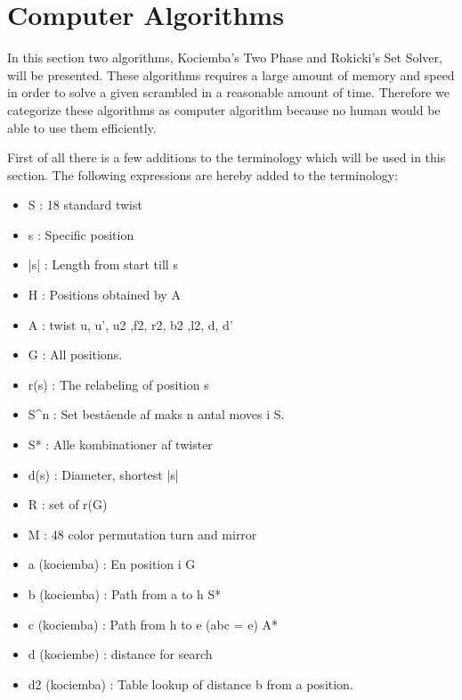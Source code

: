 \section{Computer Algorithms}
\label{sec:computerAlgorithms}
In this section two algorithms, Kociemba's Two Phase and Rokicki's Set Solver, will be presented. These algorithms requires a large amount of memory and speed in order to solve a given scrambled \rubik{} in a reasonable amount of time. Therefore we categorize these algorithms as computer algorithm because no human would be able to use them efficiently.

First of all there is a few additions to the terminology which will be used in this section. The following expressions are hereby added to the terminology:
\begin{itemize}
\item S : 18 standard twist
\item s : Specific position
\item |s| : Length from start till s
\item H : Positions obtained by A
\item A : twist u, u', u2 ,f2, r2, b2 ,l2, d, d'
\item G : All positions. 
\item r(s) : The relabeling of position s
\item S^{n} : Set best\aa{}ende af maks n antal moves i S.
\item S* : Alle kombinationer af twister
\item d(s) : Diameter, shortest |s|
\item R : set of r(G)
\item M : 48 color permutation turn and mirror

\item a (kociemba) : En position i G
\item b (kociemba) : Path from a to h S*
\item c (kociemba) : Path from h to e (abc = e) A*
\item d (kociembe) : distance for search
\item d2 (kociemba) : Table lookup of distance b from a position.

\end{itemize}
	
